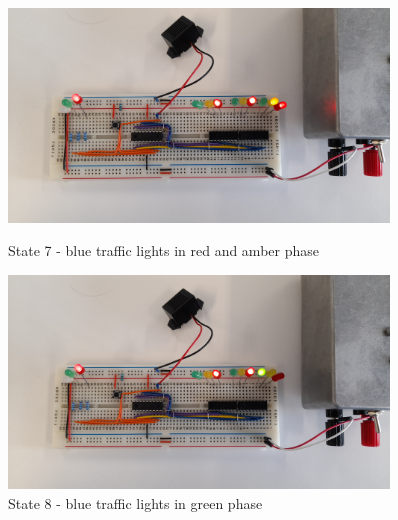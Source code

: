 \begin{figure}[H]
    \begin{minipage}{0.45\textwidth}
        \centering
        \includegraphics[width=0.9\textwidth]{images/final-testing/state_7.jpg}
        \caption{State 7 - blue traffic lights in red and amber phase}
        \label{fig:state_7}
    \end{minipage}\hfill
    \begin{minipage}{0.45\textwidth}
        \centering
        \includegraphics[width=0.9\textwidth]{images/final-testing/state_8.jpg}
        \caption{State 8 - blue traffic lights in green phase}
        \label{fig:state_8}
    \end{minipage}
\end{figure}

